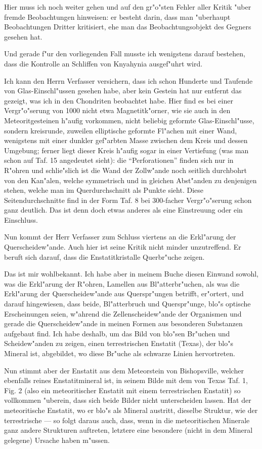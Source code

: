 \documentclass[a4paper, 12pt, oneside]{article}
\begin{document}
Hier muss ich noch weiter gehen und auf den gr"o"sten Fehler aller Kritik "uber fremde Beobachtungen hinweisen: er besteht darin, dass man "uberhaupt Beobachtungen Dritter kritisiert, ehe man das Beobachtungsobjekt des Gegners gesehen hat.

Und gerade f"ur den vorliegenden Fall musste ich wenigstens darauf bestehen, dass die Kontrolle an Schliffen von Knyahynia ausgef"uhrt wird.

Ich kann den Herrn Verfasser versichern, dass ich schon Hunderte und Taufende von Glas-Einschl"ussen gesehen habe, aber kein Gestein hat nur entfernt das gezeigt, was ich in den Chondriten beobachtet habe. Hier find es bei einer Vergr"o"serung von 1000 nicht etwa Magnetitk"orner, wie sie auch in den Meteoritgesteinen h"aufig vorkommen, nicht beliebig geformte Glas-Einschl"usse, sondern kreisrunde, zuweilen elliptische geformte Fl"achen mit einer Wand, wenigstens mit einer dunkler gef"arbten Masse zwischen dem Kreis und dessen Umgebung; ferner liegt dieser Kreis h"aufig sogar in einer Vertiefung (was man schon auf Taf. 15 angedeutet sieht): die "`Perforationen"' finden sich nur in R"ohren und schlie"slich ist die Wand der Zollw"ande noch seitlich durchbohrt von den Kan"alen, welche symmetrisch und in gleichen Abst"anden zu denjenigen stehen, welche man im Querdurchschnitt als Punkte sieht. Diese Seitendurchschnitte find in der Form Taf. 8 bei 300-facher Vergr"o"serung schon ganz deutlich. Das ist denn doch etwas anderes als eine Einstreuung oder ein Einschluss.

Nun kommt der Herr Verfasser zum Schluss viertens an die Erkl"arung der Querscheidew"ande. Auch hier ist seine Kritik nicht minder unzutreffend. Er beruft sich darauf, dass die Enstatitkristalle Querbr"uche zeigen.

Das ist mir wohlbekannt. Ich habe aber in meinem Buche diesen Einwand sowohl, was die Erkl"arung der R"ohren, Lamellen aus Bl"atterbr"uchen, als was die Erkl"arung der Querscheidew"ande aus Querspr"ungen betrifft, er"ortert, und darauf hingewiesen, dass beide, Bl"atterbruch und Querspr"unge, blo"s optische Erscheinungen seien, w"ahrend die Zellenscheidew"ande der Organismen und gerade die Querscheidew"ande in meinen Formen aus besonderen Substanzen aufgebaut find. Ich habe deshalb, um das Bild von blo"sen Br"uchen und Scheidew"anden zu zeigen, einen terrestrischen Enstatit (Texas), der blo"s Mineral ist, abgebildet, wo diese Br"uche als schwarze Linien hervortreten.

Nun stimmt aber der Enstatit aus dem Meteorstein von Bishopsville, welcher ebenfalls reines Enstatitmineral ist, in seinem Bilde mit dem von Texas Taf. 1, Fig. 2 (also ein meteoritischer Enstatit mit einem terrestrischen Enstatit) so vollkommen "uberein, dass sich beide Bilder nicht unterscheiden lassen. Hat der meteoritische Enstatit, wo er blo"s als Mineral austritt, dieselbe Struktur, wie der terrestrische --- so folgt daraus auch, dass, wenn in die meteoritischen Minerale ganz andere Strukturen auftreten, letztere eine besondere (nicht in dem Mineral gelegene) Ursache haben m"ussen.
\end{document}
